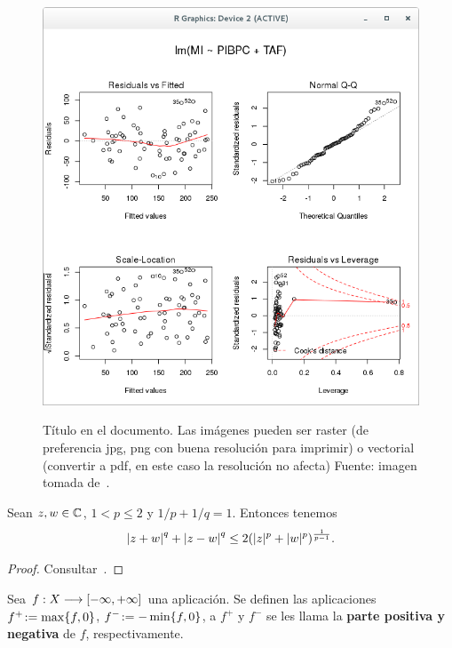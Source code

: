 \begin{figure}[ht]
\centering
\label{fig:analisisGraficoModelo3}
\includegraphics[width=0.9\linewidth]{analisisGraficoModelo3}\\
\caption[Titulo en el índice de figuras (opcional)]{Título en el 
documento. Las imágenes pueden ser raster (de preferencia jpg, png 
con buena resolución para imprimir) o vectorial (convertir a pdf, en 
este caso la resolución no afecta) Fuente: imagen tomada de~\cite{liu}.}
\end{figure}


\begin{lem}\label{lmcp11}Sean $z,w \in \mathbb{C}$, $1 < p \leq 2$ y $1/p +
1/q = 1$. Entonces tenemos \[\left\vert z+w\right\vert^q + \left\vert z-w\right\vert^q \leq 2 (|z|^p
+ |w|^p)^{\frac{1}{p-1}}.\]
\end{lem}

\begin{proof} Consultar~\cite[p. 227]{Hewit}. \end{proof}

\begin{defn}\label{dfcp5}Sea $f:X\longrightarrow [-\infty,+\infty]$ una aplicación. Se definen
las aplicaciones $f^+\!:=\max\{f,0\}$, $f^-\!:=-\min\{f,0\}$, a
$f^+$ y $f^-$ se les llama la \textbf{parte positiva y negativa} de
$f$, respectivamente.
\end{defn}



